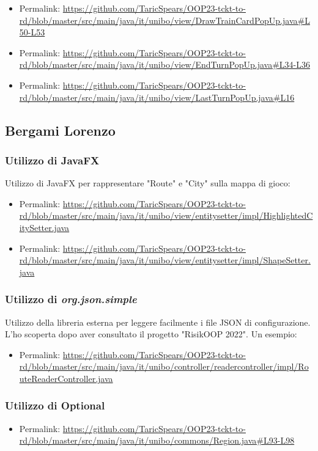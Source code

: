 \documentclass[a4paper,12pt]{report}
\begin{document}
\begin{itemize}
    \item Permalink: \url{https://github.com/TaricSpears/OOP23-tckt-to-rd/blob/master/src/main/java/it/unibo/view/DrawTrainCardPopUp.java#L50-L53}
    \item Permalink: \url{https://github.com/TaricSpears/OOP23-tckt-to-rd/blob/master/src/main/java/it/unibo/view/EndTurnPopUp.java#L34-L36}
    \item Permalink: \url{https://github.com/TaricSpears/OOP23-tckt-to-rd/blob/master/src/main/java/it/unibo/view/LastTurnPopUp.java#L16}
\end{itemize}
\newpage
\subsection{Bergami Lorenzo}
\subsubsection{Utilizzo di JavaFX}
Utilizzo di JavaFX per rappresentare "Route" e "City" sulla mappa di gioco:
\begin{itemize}
    \item Permalink: \url{https://github.com/TaricSpears/OOP23-tckt-to-rd/blob/master/src/main/java/it/unibo/view/entitysetter/impl/HighlightedCitySetter.java}
    \item Permalink: \url{https://github.com/TaricSpears/OOP23-tckt-to-rd/blob/master/src/main/java/it/unibo/view/entitysetter/impl/ShapeSetter.java}
\end{itemize}
\subsubsection{Utilizzo di \textit{org.json.simple}}
Utilizzo della libreria esterna per leggere facilmente i file JSON di configurazione. L'ho scoperta dopo aver consultato il progetto "RisikOOP 2022". Un esempio:
\begin{itemize}
    \item Permalink: \url{https://github.com/TaricSpears/OOP23-tckt-to-rd/blob/master/src/main/java/it/unibo/controller/readercontroller/impl/RouteReaderController.java}
\end{itemize}
\subsubsection{Utilizzo di Optional}
\begin{itemize}
    \item Permalink: \url{https://github.com/TaricSpears/OOP23-tckt-to-rd/blob/master/src/main/java/it/unibo/commons/Region.java#L93-L98}
\end{itemize}
\end{document}
